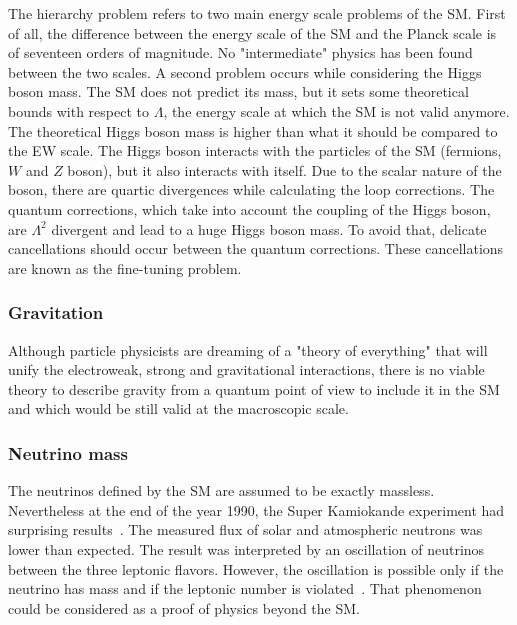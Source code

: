       The hierarchy problem refers to two main energy scale problems of the \gls{SM}.
      First of all, the difference between the energy scale of the \gls{SM} and the Planck scale is of seventeen orders of magnitude.
      No "intermediate" physics has been found between the two scales.
      A second problem occurs while considering the Higgs boson mass.
      The \gls{SM} does not predict its mass, but it sets some theoretical bounds with respect to $\Lambda$, the energy scale at which the \gls{SM} is not valid anymore.
      The theoretical Higgs boson mass is higher than what it should be compared to the EW scale.
      The Higgs boson interacts with the particles of the \gls{SM} (fermions, $W$ and $Z$ boson), but it also interacts with itself.
      Due to the scalar nature of the boson, there are quartic divergences while calculating the loop corrections.
      The quantum corrections, which take into account the coupling of the Higgs boson, are $\Lambda^2$ divergent and lead to a huge Higgs boson mass.
      To avoid that, delicate cancellations should occur between the quantum corrections.
      These cancellations are known as the fine-tuning problem. 
      
      \subsubsection{Gravitation}

      Although particle physicists are dreaming of a "theory of everything" that will unify the electroweak, strong and gravitational interactions, there is no viable theory to describe gravity from a quantum point of view to include it in the \gls{SM} and which would be still valid at the macroscopic scale.

      \subsubsection{Neutrino mass}

      The neutrinos defined by the \gls{SM} are assumed to be exactly massless.
      Nevertheless at the end of the year 1990, the Super Kamiokande experiment had surprising results~\cite{Super-Kamiokande-Oscillation}.
      The measured flux of solar and atmospheric neutrons was lower than expected.
      The result was interpreted by an oscillation of neutrinos between the three leptonic flavors.
      However, the oscillation is possible only if the neutrino has mass and if the leptonic number is violated~\cite{Dib}.
      That phenomenon could be considered as a proof of physics beyond the \gls{SM}.

